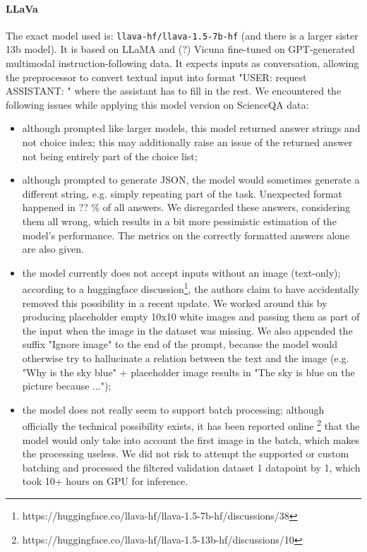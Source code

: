 \documentclass{article}
\begin{document}
\paragraph{LLaVa} The exact model used is: \texttt{llava-hf/llava-1.5-7b-hf} (and there is a larger sister 13b model). It is based on LLaMA and (?) Vicuna fine-tuned on GPT-generated multimodal instruction-following data.
It expects inputs as conversation, allowing the preprocessor to convert textual input into format "USER: {request} ASSISTANT: " where the assistant has to fill in the rest. 
We encountered the following issues while applying this model version on ScienceQA data: 
\begin{itemize}
	\item although prompted like larger models, this model returned answer strings and not choice index; this may additionally raise an issue of the returned answer not being entirely part of the choice list;
	\item although prompted to generate JSON, the model would sometimes generate a different string, e.g. simply repeating part of the task. Unexpected format happened in ?? \% of all answers. We disregarded these answers, considering them all wrong, which results in a bit more pessimistic estimation of the model's performance. The metrics on the correctly formatted answers alone are also given. 
	\item the model currently does not accept inputs without an image (text-only); according to a huggingface discussion\footnote{https://huggingface.co/llava-hf/llava-1.5-7b-hf/discussions/38}, the authors claim to have accidentally removed this possibility in a recent update. We worked around this by producing placeholder empty 10x10 white images and passing them as part of the input when the image in the dataset was missing. We also appended the suffix "Ignore image" to the end of the prompt, because the model would otherwise try to hallucinate a relation between the text and the image (e.g. "Why is the sky blue" + placeholder image results in "The sky is blue on the picture because ...");
	\item the model does not really seem to support batch processing; although officially the technical possibility exists, it has been reported online \footnote{https://huggingface.co/llava-hf/llava-1.5-13b-hf/discussions/10} that the model would only take into account the first image in the batch, which makes the processing useless. We did not risk to attempt the supported or custom batching and processed the filtered validation dataset 1 datapoint by 1, which took 10+ hours on GPU for inference. 
\end{itemize}
\end{document}
